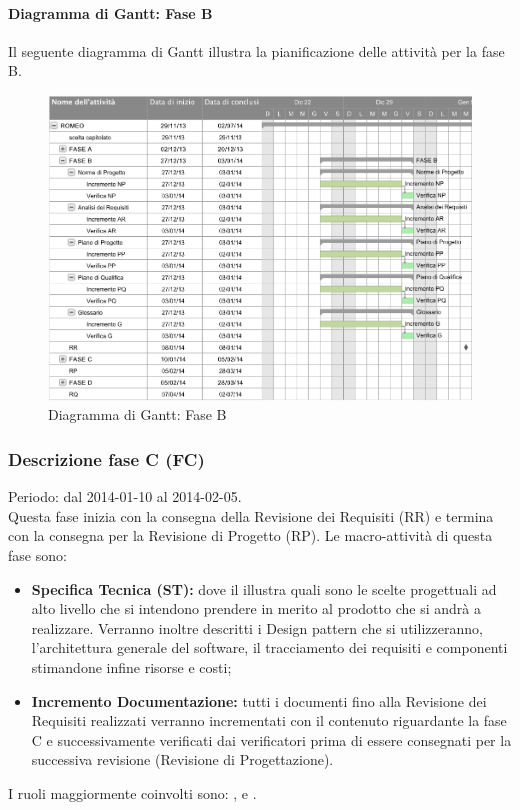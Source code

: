 \paragraph{Diagramma di Gantt: Fase B }
\label{DiagrammaIncrementale}
Il seguente diagramma di Gantt\g{} illustra la pianificazione delle attività per la fase B.
\begin{figure}[h]
	\centering
	\includegraphics[width=\textwidth]{./content/Immagini/faseB.png}
	\caption{Diagramma di Gantt: Fase B}
\end{figure}
\pagebreak
\subsubsection{Descrizione fase C (FC)}
\label{Progettazione Architetturale (FPA)}
Periodo: dal 2014-01-10 al 2014-02-05. \\
Questa fase inizia con la consegna della Revisione dei Requisiti (RR) e termina con la consegna per la Revisione di Progetto (RP).
Le macro-attività di questa fase sono:
\begin{itemize}
\item \textbf{Specifica Tecnica (ST):} dove il \designer{} illustra quali sono le scelte progettuali ad alto livello che si intendono prendere in merito al prodotto che si andrà a realizzare. Verranno inoltre descritti i Design pattern\glossario{} che si utilizzeranno, l'architettura generale del software, il tracciamento dei requisiti e componenti stimandone infine risorse e costi;
\item \textbf{Incremento Documentazione:} tutti i documenti fino alla Revisione dei Requisiti realizzati verranno incrementati con il contenuto riguardante la fase C e successivamente verificati dai verificatori prima di essere consegnati per la successiva revisione (Revisione di Progettazione).
\end{itemize}
I ruoli maggiormente coinvolti sono: \designer , \verifier{} e \analyst.
